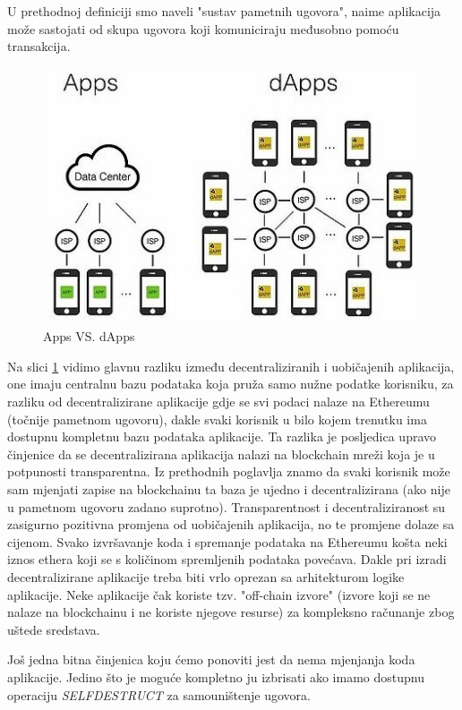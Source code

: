 \documentclass[a4paper,oneside,12pt]{memoir} %
\begin{document}
\begin{napomena}
U prethodnoj definiciji smo naveli "sustav pametnih ugovora", naime aplikacija može sastojati od skupa ugovora koji komuniciraju međusobno pomoću transakcija.
\end{napomena}

\begin{figure}[h]
\centering
\includegraphics[scale=0.7]{AppsVSdApps}
\caption{Apps VS. dApps}
\label{fig:appvsdapp}
\end{figure}

Na slici \ref{fig:appvsdapp} vidimo glavnu razliku između decentraliziranih i uobičajenih aplikacija, one imaju centralnu bazu podataka koja pruža samo nužne podatke korisniku, za razliku od decentralizirane aplikacije gdje se svi podaci nalaze na Ethereumu (točnije pametnom ugovoru), dakle svaki korisnik u bilo kojem trenutku ima dostupnu kompletnu bazu podataka aplikacije. Ta razlika je posljedica upravo činjenice da se decentralizirana aplikacija nalazi na blockchain mreži koja je u potpunosti transparentna. Iz prethodnih poglavlja znamo da svaki korisnik može sam mjenjati zapise na blockchainu ta baza je ujedno i decentralizirana (ako nije u pametnom ugovoru zadano suprotno). Transparentnost i decentraliziranost su zasigurno pozitivna promjena od uobičajenih aplikacija, no te promjene dolaze sa cijenom. Svako izvršavanje koda i spremanje podataka na Ethereumu košta neki iznos ethera koji se s količinom spremljenih podataka povećava. Dakle pri izradi decentralizirane aplikacije treba biti vrlo oprezan sa arhitekturom logike aplikacije. Neke aplikacije čak koriste tzv. "off-chain izvore" (izvore koji se ne nalaze na blockchainu i ne koriste njegove resurse) za kompleksno računanje zbog uštede sredstava.

Još jedna bitna činjenica koju ćemo ponoviti jest da nema mjenjanja koda aplikacije. Jedino što je moguće kompletno ju izbrisati ako imamo dostupnu operaciju \emph{SELFDESTRUCT} za samouništenje ugovora.
\end{document}
